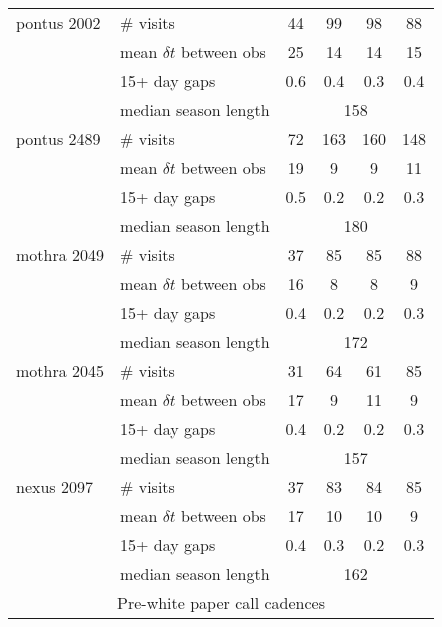 \begin{appendices}
\begin{longtable}{l|l|cccc}
  pontus 2002    & \# visits                   &  44  &  99  &  98  &  88  \\
                 & mean $\delta t$ between obs &  25  &  14  &  14  &  15  \\
                 & 15+ day gaps                & 0.6  & 0.4  & 0.3  & 0.4  \\
                 & median season length               & \multicolumn{4}{c}{158}   \\
  \hline

  pontus 2489    & \# visits                   &  72  & 163  & 160  &  148 \\
                 & mean $\delta t$ between obs &  19  &   9  &   9  &   11 \\
                 & 15+ day gaps                & 0.5  & 0.2  & 0.2  &  0.3 \\
                 & median season length               & \multicolumn{4}{c}{180}   \\
  \hline

  mothra 2049    & \# visits                   &   37 &  85  &  85  &  88  \\
                 & mean $\delta t$ between obs &   16 &   8  &   8  &   9  \\
                 & 15+ day gaps                &  0.4 & 0.2  & 0.2  & 0.3  \\
                 & median season length               & \multicolumn{4}{c}{172}   \\
  \hline

  mothra 2045    & \# visits                   &   31 &  64  &  61  &  85  \\
                 & mean $\delta t$ between obs &   17 &   9  &  11  &   9  \\
                 & 15+ day gaps                &  0.4 & 0.2  & 0.2  & 0.3  \\
                 & median season length               & \multicolumn{4}{c}{157}   \\
  \hline

  nexus 2097     & \# visits                   &  37  &  83  &  84  &  85  \\
                 & mean $\delta t$ between obs &  17  &  10  &  10  &   9  \\
                 & 15+ day gaps                & 0.4  & 0.3  & 0.2  & 0.3  \\
                 & median season length               & \multicolumn{4}{c}{162}   \\
  \hline
  \hline
  \multicolumn{6}{c}{Pre-white paper call cadences}\\
  \hline


\end{longtable}
\end{appendices}
